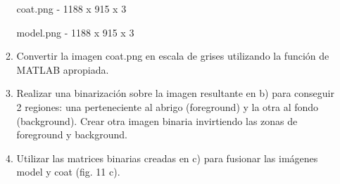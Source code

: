 \documentclass[a4paper,10pt]{article}
\begin{document}
\begin{enumerate}
\begin{enumerate}
  coat.png - 1188 x 915 x 3
  
  model.png - 1188 x 915 x 3
  
  \item Convertir la imagen coat.png en escala de grises utilizando la  función de 
MATLAB apropiada.

  \item Realizar una binarización sobre la imagen resultante en b) para conseguir 
2  regiones:  una  perteneciente  al  abrigo (foreground)  y  la  otra  al  fondo 
(background).  Crear  otra  imagen  binaria  invirtiendo  las  zonas  de 
foreground y background.

  \item Utilizar  las  matrices  binarias  creadas  en  c)  para  fusionar  las  imágenes 
model y  coat (fig. 11 c).

 \end{enumerate} 
 
\end{enumerate}


% 
\end{document}
